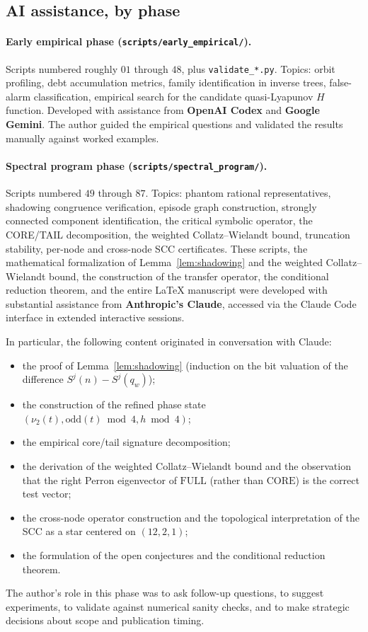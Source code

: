 \documentclass[11pt,a4paper]{article}
\theoremstyle{definition}
\newcommand{\full}{\mathrm{FULL}}
\newcommand{\core}{\mathrm{CORE}}
\begin{document}
\subsection{AI assistance, by phase}

\paragraph{Early empirical phase (\texttt{scripts/early\_empirical/}).}
Scripts numbered roughly $01$ through $48$, plus
\texttt{validate\_*.py}. Topics: orbit profiling, debt
accumulation metrics, family identification in inverse trees,
false-alarm classification, empirical search for the candidate
quasi-Lyapunov $H$ function. Developed with assistance from
\textbf{OpenAI Codex} and \textbf{Google Gemini}. The author
guided the empirical questions and validated the results manually
against worked examples.

\paragraph{Spectral program phase (\texttt{scripts/spectral\_program/}).}
Scripts numbered $49$ through $87$. Topics: phantom rational
representatives, shadowing congruence verification, episode graph
construction, strongly connected component identification, the
critical symbolic operator, the CORE/TAIL decomposition, the
weighted Collatz--Wielandt bound, truncation stability, per-node
and cross-node SCC certificates. These scripts, the mathematical
formalization of Lemma~\ref{lem:shadowing} and the weighted
Collatz--Wielandt bound, the construction of the transfer
operator, the conditional reduction theorem, and the entire
\LaTeX{} manuscript were developed with substantial assistance
from \textbf{Anthropic's Claude}, accessed via the Claude Code
interface in extended interactive sessions.

In particular, the following content originated in conversation
with Claude:
\begin{itemize}
  \item the proof of Lemma~\ref{lem:shadowing} (induction on the
        bit valuation of the difference $S^j(n) - S^j(q_w)$);
  \item the construction of the refined phase state
        $(\nu_2(t), \mathrm{odd}(t) \bmod 4, h \bmod 4)$;
  \item the empirical core/tail signature decomposition;
  \item the derivation of the weighted Collatz--Wielandt bound and
        the observation that the right Perron eigenvector of
        $\full$ (rather than $\core$) is the correct test vector;
  \item the cross-node operator construction and the topological
        interpretation of the SCC as a star centered on
        $(12, 2, 1)$;
  \item the formulation of the open conjectures and the conditional
        reduction theorem.
\end{itemize}
The author's role in this phase was to ask follow-up questions, to
suggest experiments, to validate against numerical sanity checks,
and to make strategic decisions about scope and publication
timing.
\end{document}
